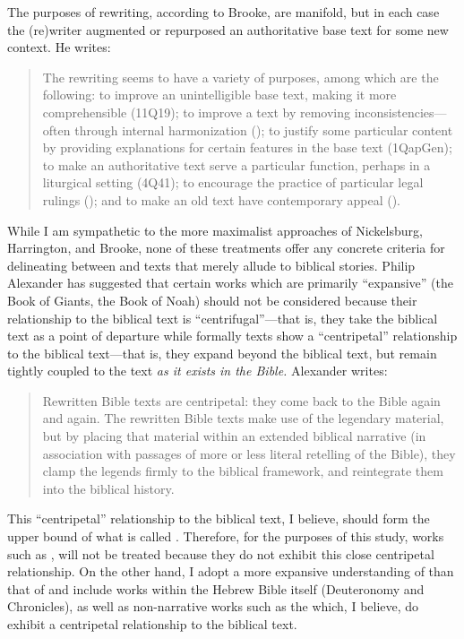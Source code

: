 The purposes of rewriting, according to Brooke, are manifold, but in each case the (re)writer augmented or repurposed an authoritative base text for some new context. He writes: 

\begin{quote}
    The rewriting seems to have a variety of purposes, among which are the following: to improve an unintelligible base text, making it more comprehensible (11Q19); to improve a text by removing inconsistencies---often through internal harmonization (); to justify some particular content by providing explanations for certain features in the base text (1QapGen); to make an authoritative text serve a particular function, perhaps in a liturgical setting (4Q41); to encourage the practice of particular legal rulings (\jub); and to make an old text have contemporary appeal (\templescroll).\autocite[778]{brooke_schiffman-vanderkam2000}
\end{quote} 

While I am sympathetic to the more maximalist approaches of Nickelsburg, Harrington, and Brooke, none of these treatments offer any concrete criteria for delineating between \rwb and texts that merely allude to biblical stories. Philip Alexander has suggested that certain works which are primarily ``expansive'' (the Book of Giants, the Book of Noah) should not be considered \rwb because their relationship to the biblical text is ``centrifugal''---that is, they take the biblical text as a point of departure while formally \rwb texts show a ``centripetal'' relationship to the biblical text---that is, they expand beyond the biblical text, but remain tightly coupled to the text \emph{as it exists in the Bible.} Alexander writes: 

\begin{quote}
    Rewritten Bible texts are centripetal: they come back to the Bible again and again. The rewritten Bible texts make use of the legendary material, but by placing that material within an extended biblical narrative (in association with passages of more or less literal retelling of the Bible), they clamp the legends firmly to the biblical framework, and reintegrate them into the biblical history. \autocite[117]{alexander_carson-williamson1988}
\end{quote} 

This ``centripetal'' relationship to the biblical text, I believe, should form the upper bound of what is called \rwb. Therefore, for the purposes of this study, works such as \firstenoch, will not be treated because they do not exhibit this close centripetal relationship. On the other hand, I adopt a more expansive understanding of \rwb than that of \vermes and include works within the Hebrew Bible itself (Deuteronomy and Chronicles), as well as non-narrative works such as the \templescroll which, I believe, do exhibit a centripetal relationship to the biblical text. 

